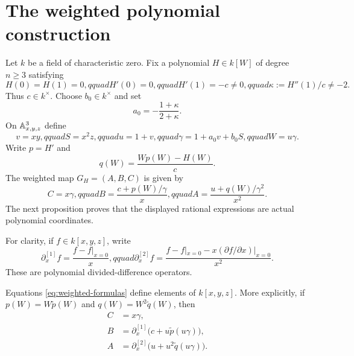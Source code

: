 \section{The weighted polynomial construction}\label{sec:weighted-map}

Let $k$ be a field of characteristic zero.  Fix a polynomial $H\in k[W]$ of
degree $n\ge3$ satisfying
\begin{equation}\label{eq:admissible-H}
 H(0)=H(1)=0,qquad H'(0)=0,qquad H'(1)=-c\ne0,qquad
 \kappa:=H''(1)/c\ne-2.
\end{equation}
Thus $c\in k^\times$.  Choose $b_0\in k^\times$ and set
\begin{equation}\label{eq:a0}
 a_0=-\frac{1+\kappa}{2+\kappa}.
\end{equation}
On $\mathbb A^3_{x,y,z}$ define
\begin{equation}\label{eq:weighted-source-invariants}
 v=xy,qquad S=x^2z,qquad u=1+v,qquad
 \gamma=1+a_0v+b_0S,qquad W=u\gamma.
\end{equation}
Write $p=H'$ and
\begin{equation}\label{eq:qdef}
 q(W)=\frac{Wp(W)-H(W)}{c}.
\end{equation}
The weighted map $G_H=(A,B,C)$ is given by
\begin{equation}\label{eq:weighted-formulas}
 C=x\gamma,qquad
 B=\frac{c+p(W)/\gamma}{x},qquad
 A=\frac{u+q(W)/\gamma^2}{x^2}.
\end{equation}
The next proposition proves that the displayed rational expressions are
actual polynomial coordinates.

For clarity, if $f\in k[x,y,z]$, write
\[
 \partial_x^{[1]}f=\frac{f-f|_{x=0}}x,qquad
 \partial_x^{[2]}f=
 \frac{f-f|_{x=0}-x(\partial f/\partial x)|_{x=0}}{x^2}.
\]
These are polynomial divided-difference operators.

\begin{proposition}[polynomiality]\label{prop:weighted-polynomiality}
Equations \eqref{eq:weighted-formulas} define elements of $k[x,y,z]$.
More explicitly, if $p(W)=W\widetilde p(W)$ and
$q(W)=W^2\widetilde q(W)$, then
\begin{align*}
 C&=x\gamma,\\
 B&=\partial_x^{[1]}\bigl(c+u\widetilde p(u\gamma)\bigr),\\
 A&=\partial_x^{[2]}\bigl(u+u^2\widetilde q(u\gamma)\bigr).
\end{align*}
\end{proposition}

